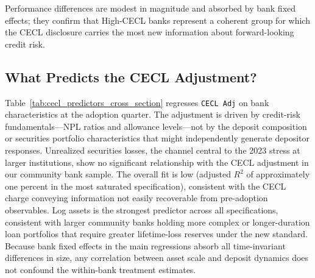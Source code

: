 Performance differences are modest in magnitude and absorbed by bank fixed
effects; they confirm that High-CECL banks represent a coherent group for which
the CECL disclosure carries the most new information about forward-looking credit
risk.

\subsection{What Predicts the CECL Adjustment?}
\label{sec:descriptive:predictors}

Table~\ref{tab:cecl_predictors_cross_section} regresses \texttt{CECL Adj} on
bank characteristics at the adoption quarter.  The adjustment is driven by
credit-risk fundamentals---NPL ratios and allowance levels---not by the deposit
composition or securities portfolio characteristics that might independently
generate depositor responses.  Unrealized securities losses, the channel central
to the 2023 stress at larger institutions, show no significant relationship with
the CECL adjustment in our community bank sample.  The overall fit is low
(adjusted $R^2$ of approximately one percent in the most saturated specification),
consistent with the CECL charge conveying information not easily recoverable from
pre-adoption observables.  Log assets is the strongest predictor across all
specifications, consistent with larger community banks holding more complex or
longer-duration loan portfolios that require greater lifetime-loss reserves
under the new standard.  Because bank fixed effects in the main regressions
absorb all time-invariant differences in size, any correlation between asset
scale and deposit dynamics does not confound the within-bank treatment
estimates.
